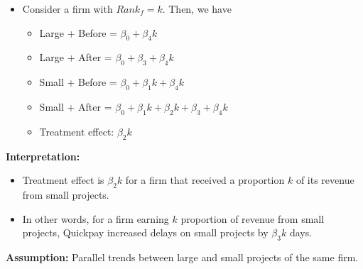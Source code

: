 \documentclass[
]{article}
\providecommand{\tightlist}{%
  \setlength{\itemsep}{0pt}\setlength{\parskip}{0pt}}
\begin{document}
\begin{itemize}
\tightlist
\item
  Consider a firm with \(Rank_f = k\). Then, we have

  \begin{itemize}
  \tightlist
  \item
    Large + Before = \(\beta_0 + \beta_4 k\)
  \item
    Large + After = \(\beta_0+\beta_3 +\beta_4 k\)
  \item
    Small + Before = \(\beta_0+\beta_1 k + \beta_4 k\)
  \item
    Small + After =
    \(\beta_0+\beta_1 k + \beta_2 k + \beta_3 + \beta_4 k\)
  \item
    Treatment effect: \(\beta_2 k\)
  \end{itemize}
\end{itemize}

\textbf{Interpretation:}

\begin{itemize}
\tightlist
\item
  Treatment effect is \(\beta_2 k\) for a firm that received a
  proportion \(k\) of its revenue from small projects.
\item
  In other words, for a firm earning \(k\) proportion of revenue from
  small projects, Quickpay increased delays on small projects by
  \(\beta_3 k\) days.
\end{itemize}

\textbf{Assumption:} Parallel trends between large and small projects of
the same firm.
\end{document}
